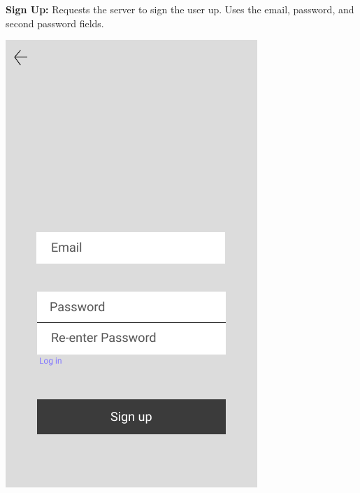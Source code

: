 \documentclass{scrreprt}
\begin{document}
\textbf{Sign Up:}
Requests the server to sign the user up.  Uses the email, password, and second password fields.
\begin{center}
\includegraphics[scale=0.4]{signup.png}
\end{center}
\end{document}
